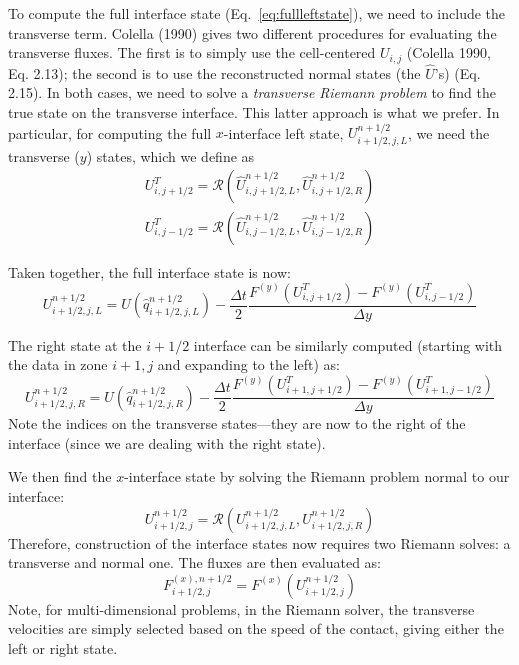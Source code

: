 To compute the full interface state (Eq.~\ref{eq:fullleftstate}), we 
need to include the transverse term.
Colella (1990) gives two different procedures for evaluating the
transverse fluxes.  The first is to simply use the cell-centered
$U_{i,j}$ (Colella 1990,
Eq. 2.13); the second is to use the reconstructed normal states (the
$\hat{U}$'s) (Eq. 2.15).  In both cases, we need to solve a {\em
  transverse Riemann problem} to find the true state on the transverse
interface.  This latter approach is what we prefer.  In particular, 
for computing the full $x$-interface left state, $U_{i+1/2,j,L}^{n+1/2}$, we need the 
transverse ($y$) states, which we define as
\begin{eqnarray}
U^T_{i,j+1/2} = \mathcal{R}(\hat{U}^{n+1/2}_{i,j+1/2,L}, 
                            \hat{U}^{n+1/2}_{i,j+1/2,R}) \\
U^T_{i,j-1/2} = \mathcal{R}(\hat{U}^{n+1/2}_{i,j-1/2,L}, 
                            \hat{U}^{n+1/2}_{i,j-1/2,R})
\end{eqnarray}

Taken together, the full interface state is now:
\begin{equation}
U_{i+1/2,j,L}^{n+1/2} = U(\hat{q}_{i+1/2,j,L}^{n+1/2}) 
   - \frac{\Delta t}{2} \frac{F^{(y)}(U^T_{i,j+1/2}) - F^{(y)}(U^T_{i,j-1/2})}{\Delta y}
\end{equation}

The right state at the $i+1/2$ interface can be similarly computed (starting with the
data in zone $i+1,j$ and expanding to the left) as:
\begin{equation}
U_{i+1/2,j,R}^{n+1/2} = U(\hat{q}_{i+1/2,j,R}^{n+1/2}) 
   - \frac{\Delta t}{2} \frac{F^{(y)}(U^T_{i+1,j+1/2}) - F^{(y)}(U^T_{i+1,j-1/2})}{\Delta y}
\end{equation}
Note the indices on the transverse states---they are now to the right of the interface (since
we are dealing with the right state).

We then find the $x$-interface state by solving the Riemann problem
normal to our interface:
\begin{equation}
U_{i+1/2,j}^{n+1/2} = \mathcal{R}(U_{i+1/2,j,L}^{n+1/2}, U_{i+1/2,j,R}^{n+1/2})
\end{equation}
Therefore, construction of the interface states now requires two
Riemann solves: a transverse and normal one.  The fluxes are then evaluated as:
\begin{equation}
F^{(x),n+1/2}_{i+1/2,j} = F^{(x)}(U_{i+1/2,j}^{n+1/2})
\end{equation}
Note, for multi-dimensional problems, in the Riemann solver, the transverse
velocities are simply selected based on the speed of the contact, giving
either the left or right state.
 
